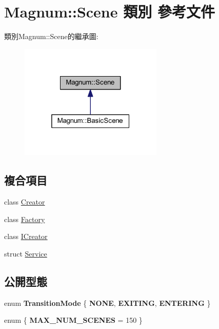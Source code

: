 \hypertarget{class_magnum_1_1_scene}{}\section{Magnum\+:\+:Scene 類別 參考文件}
\label{class_magnum_1_1_scene}


類別\+Magnum\+:\+:Scene的繼承圖\+:\nopagebreak
\begin{figure}[H]
\begin{center}
\leavevmode
\includegraphics[width=193pt]{class_magnum_1_1_scene__inherit__graph}
\end{center}
\end{figure}
\subsection*{複合項目}
\begin{DoxyCompactItemize}
\item 
class \hyperlink{class_magnum_1_1_scene_1_1_creator}{Creator}
\item 
class \hyperlink{class_magnum_1_1_scene_1_1_factory}{Factory}
\item 
class \hyperlink{class_magnum_1_1_scene_1_1_i_creator}{I\+Creator}
\item 
struct \hyperlink{struct_magnum_1_1_scene_1_1_service}{Service}
\end{DoxyCompactItemize}
\subsection*{公開型態}
\begin{DoxyCompactItemize}
\item 
enum {\bfseries Transition\+Mode} \{ {\bfseries N\+O\+NE}, 
{\bfseries E\+X\+I\+T\+I\+NG}, 
{\bfseries E\+N\+T\+E\+R\+I\+NG}
 \}\hypertarget{class_magnum_1_1_scene_a3f1b88665163c1c26df9a98de69ef986}{}\label{class_magnum_1_1_scene_a3f1b88665163c1c26df9a98de69ef986}

\item 
enum \{ {\bfseries M\+A\+X\+\_\+\+N\+U\+M\+\_\+\+S\+C\+E\+N\+ES} = 150
 \}\hypertarget{class_magnum_1_1_scene_a2ff0d3bea512911e9e74a49877c4a0e0}{}\label{class_magnum_1_1_scene_a2ff0d3bea512911e9e74a49877c4a0e0}

\end{DoxyCompactItemize}
